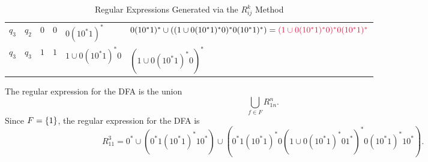 \begin{problem}
\begin{enumalph}
\begin{Answer}
\begin{table}[H]
{\begin{tabular}{|l|l|l|l|l|l|}
            $q_3$ & $q_2$ & $0$   & $0$                             & $0(10^*1)^*$                                      & $0(10^*1)^* \cup ((1 \cup 0(10^*1)^*0)^*0(10^*1)^*) = \crim{(1 \cup 0(10^*1)^*0)^*0(10^*1)^*}$ \\
            $q_3$ & $q_3$ & $1$   & $1$                             & $1 \cup 0(10^*1)^*0$                              & $(1 \cup 0(10^*1)^*0)^*$ \\
            \toprule
          \end{tabular}
          }
          \caption{Regular Expressions Generated via the $R_{ij}^k$ Method}
        \end{table}

        \step
        The regular expression for the DFA is the union
        \[ \bigcup_{f \in F} R^n_{1n}. \]
        Since $F = \left\{1\right\}$, the regular expression for the DFA is
        \[ R_{11}^3 = 0^* \cup (0^*1(10^*1)^*10^*) \cup (0^*1(10^*1)^*0(1 \cup 0(10^*1)^*01^*)^*0(10^*1)^*10^*). \]
      \end{Answer}
  \end{enumalph}
\end{problem}
